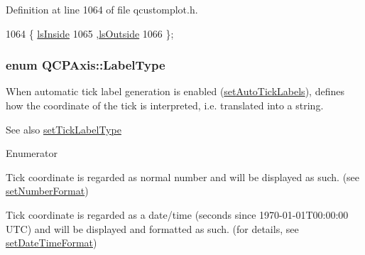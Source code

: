 Definition at line 1064 of file qcustomplot.\+h.


\begin{DoxyCode}
1064                  \{ \hyperlink{class_q_c_p_axis_a24b13374b9b8f75f47eed2ea78c37db9aae7b027ac2839cf4ad611df30236fc3f}{lsInside}    
1065                    ,\hyperlink{class_q_c_p_axis_a24b13374b9b8f75f47eed2ea78c37db9a2eadb509fc0c9a8b35b85c86ec9f3c7a}{lsOutside}  
1066                  \};
\end{DoxyCode}
\hypertarget{class_q_c_p_axis_a4a7da0166f755f5abac23b765d184cad}{}
\subsubsection[{Label\+Type}]{\setlength{\rightskip}{0pt plus 5cm}enum {\bf Q\+C\+P\+Axis\+::\+Label\+Type}}\label{class_q_c_p_axis_a4a7da0166f755f5abac23b765d184cad}
When automatic tick label generation is enabled (\hyperlink{class_q_c_p_axis_aaa47e3a6bac0c20d4beb9028f01bc1a1}{set\+Auto\+Tick\+Labels}), defines how the coordinate of the tick is interpreted, i.\+e. translated into a string.

\begin{DoxySeeAlso}{See also}
\hyperlink{class_q_c_p_axis_a54f24f5ce8feea25209388a863d7e448}{set\+Tick\+Label\+Type} 
\end{DoxySeeAlso}
\begin{Desc}
\item[Enumerator]\par
\begin{description}
\item[{\em 
\hypertarget{class_q_c_p_axis_a4a7da0166f755f5abac23b765d184cada7f1eacf3b73adaefd334bea04e094b7e}{}lt\+Number\label{class_q_c_p_axis_a4a7da0166f755f5abac23b765d184cada7f1eacf3b73adaefd334bea04e094b7e}
}]Tick coordinate is regarded as normal number and will be displayed as such. (see \hyperlink{class_q_c_p_axis_ae585a54dc2aac662e90a2ca82f002590}{set\+Number\+Format}) \item[{\em 
\hypertarget{class_q_c_p_axis_a4a7da0166f755f5abac23b765d184cadafc70594a9d877124dd11ccc187d4ac52}{}lt\+Date\+Time\label{class_q_c_p_axis_a4a7da0166f755f5abac23b765d184cadafc70594a9d877124dd11ccc187d4ac52}
}]Tick coordinate is regarded as a date/time (seconds since 1970-\/01-\/01\+T00\+:00\+:00 U\+T\+C) and will be displayed and formatted as such. (for details, see \hyperlink{class_q_c_p_axis_a2ee0191daa03524a682113e63e05f7a7}{set\+Date\+Time\+Format}) \end{description}
\end{Desc}


